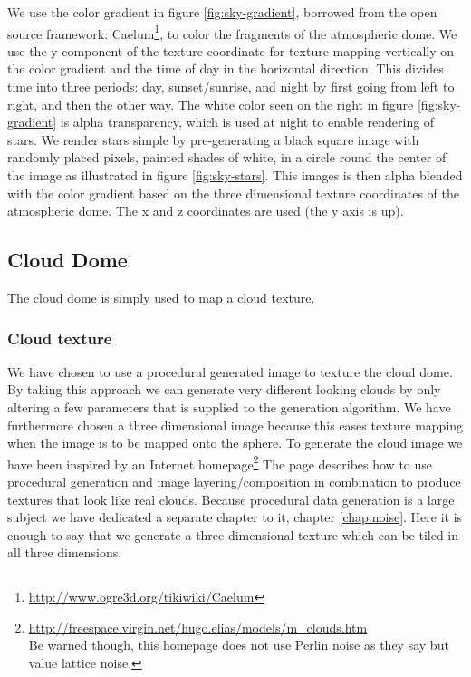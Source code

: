 We use the color gradient in figure \ref{fig:sky-gradient}, borrowed
from the open source framework:
Caelum\footnote{\url{http://www.ogre3d.org/tikiwiki/Caelum}}, to color
the fragments of the atmospheric dome. We use the y-component of the
texture coordinate for texture mapping vertically on the color
gradient and the time of day in the horizontal direction. This divides
time into three periods: day, sunset/sunrise, and night by first going
from left to right, and then the other way.
%
The white color seen on the right in figure \ref{fig:sky-gradient}
is alpha transparency, which is used at night to enable rendering of
stars. We render stars simple by pre-generating a black square image
with randomly placed pixels, painted shades of white, in a circle
round the center of the image as illustrated in figure
\ref{fig:sky-stars}. This images is then alpha blended with the color
gradient based on the three dimensional texture coordinates of the
atmospheric dome. The x and z coordinates are used (the y axis is up).

\subsection{Cloud Dome}
The cloud dome is simply used to map a cloud texture.

\subsubsection{Cloud texture}
We have chosen to use a procedural generated image to texture the
cloud dome. By taking this approach we can generate very different
looking clouds by only altering a few parameters that is supplied to
the generation algorithm.
%
We have furthermore chosen a three dimensional image because this
eases texture mapping when the image is to be mapped onto the sphere.
%
To generate the cloud image we have been inspired by an Internet
homepage\footnote{\url{http://freespace.virgin.net/hugo.elias/models/m_clouds.htm}
  \\Be warned though, this homepage does not use Perlin noise as they
  say but value lattice noise.}  The page describes how to use
procedural generation and image layering/composition in combination to
produce textures that look like real clouds.  Because procedural data
generation is a large subject we have dedicated a separate chapter to
it, chapter \ref{chap:noise}. Here it is enough to say that we
generate a three dimensional texture which can be tiled in all three
dimensions.

